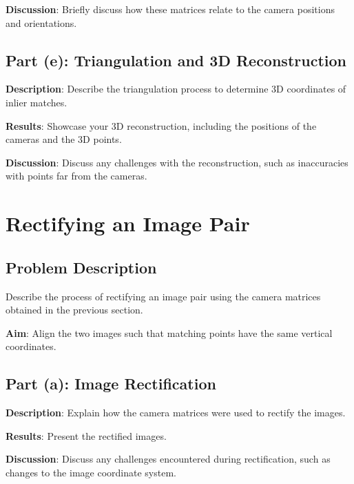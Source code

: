 \documentclass{article}
\begin{document}
\textbf{Discussion}: Briefly discuss how these matrices relate to the camera positions and orientations.

\subsection{Part (e): Triangulation and 3D Reconstruction}
\textbf{Description}: Describe the triangulation process to determine 3D coordinates of inlier matches.

\textbf{Results}: Showcase your 3D reconstruction, including the positions of the cameras and the 3D points.


\textbf{Discussion}: Discuss any challenges with the reconstruction, such as inaccuracies with points far from the cameras.

\section{Rectifying an Image Pair}

\subsection{Problem Description}
Describe the process of rectifying an image pair using the camera matrices obtained in the previous section.

\textbf{Aim}: Align the two images such that matching points have the same vertical coordinates.

\subsection{Part (a): Image Rectification}
\textbf{Description}: Explain how the camera matrices were used to rectify the images.

\textbf{Results}: Present the rectified images.


\textbf{Discussion}: Discuss any challenges encountered during rectification, such as changes to the image coordinate system.
\end{document}

